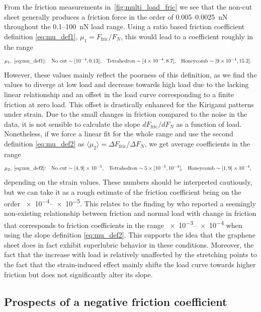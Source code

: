 From the friction measurements in~\cref{fig:multi_load_fric} we see that the
non-cut sheet generally produces a friction force in the order of 0.005--\SI{0.0025}{nN} throughout the 0.1--\SI{100}{nN} load range. Using a ratio based friction coefficient definition \cref{eq:mu_def1}, $\mu_1 = F_{\text{fric}}/{F_N}$, this would lead to a coefficient roughly in the range
\begin{align*}
  &\mu_1,  \ \text{\cref{eq:mu_def1}:}& &\text{No cut}\sim [\num{e-4}, 0.13],&  &\text{Tetrahedron}\sim [\num{4e-4},8.7],& &\text{Honeycomb}\sim [\num{9e-4}, 15.2].&
\end{align*}
However, these values mainly reflect the poorness of this definition, as we find the values to diverge at low load and decrease towards high load due to the lacking linear relationship and an offset in the load curve corresponding to a finite friction at zero load. This offset is drastically enhanced for the Kirigami patterns under strain. Due to the small changes in friction compared to the noise in the data, it is not sensible to calculate the slope $dF_{\text{fric}}/dF_N$ as a function of load. Nonetheless, if we force a linear fit for the whole range and use the second definition \cref{eq:mu_def2} as $\langle \mu_2 \rangle = \Delta F_{\text{fric}}/\Delta F_N$, we get average coefficients in the range
\begin{align*}
  &\mu_2,  \ \text{\cref{eq:mu_def2}:}& &\text{No cut} \sim [4, 9]\times \num{e-5},&  &\text{Tetrahedron} \sim 5\times[\num{e-5}, \num{e-4}],& &\text{Honeycomb} \sim [1,9]\times \num{e-4},&
\end{align*}
depending on the strain values. These numbers should be interpreted cautiously,
but we can take it as a rough estimate of the friction coefficient being on
the order \num{e-4}--\num{e-5}. This relates to the finding by
\cite{DIENWIEBEL2005197} who reported a seemingly non-existing relationship
between friction and normal load with change in friction that corresponds to friction coefficients in the range \num{e-3}--\num{e-4} when using the slope definition \cref{eq:mu_def2}. This supports the idea that the graphene sheet does in fact exhibit superlubric behavior in these conditions. Moreover, the fact that the increase with load is relatively unaffected by the stretching points to the fact that the strain-induced effect mainly shifts the load curve towards higher friction but does not significantly alter its slope. 


\subsection{Prospects of a negative friction coefficient}\label{sec:neg_prospects}

